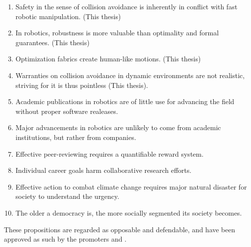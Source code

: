 \documentclass[nativefonts]{src/TUD-dissertation2020}
\begin{document}
\begin{enumerate}

  \item Safety in the sense of collision avoidance is inherently in conflict
    with fast robotic manipulation. (This thesis)
  \item In robotics, robustness is more valuable than optimality and formal
    guarantees. (This thesis)
  \item Optimization fabrics create human-like motions. (This thesis)
  \item Warranties on collision avoidance in dynamic environments are not
    realistic, striving for it is thus pointless (This thesis).
  \item Academic publications in robotics are of little use for advancing the
    field without proper software realeases.
  \item Major advancements in robotics are unlikely to come from academic
    institutions, but rather from companies.
  \item Effective peer-reviewing requires a quantifiable reward system.
  \item Individual career goals harm collaborative research efforts.
  \item Effective action to combat climate change requires major natural disaster
    for society to understand the urgency.
  \item The older a democracy is, the more socially
    segmented its society becomes.
\end{enumerate}

\bigskip
\bigskip

\begin{center}
These propositions are regarded as opposable and defendable, and have been
  approved as such by the promoters \promotor{} and \copromotor{}.
\end{center}

\clearpage
\end{document}
